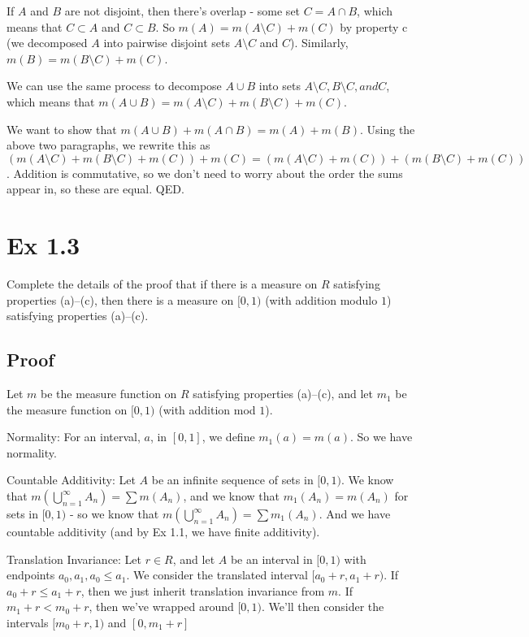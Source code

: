 \documentclass{article}
\begin{document}
If $A$ and $B$ are not disjoint, then there's overlap - some set $C = A \cap B$, which means that $C \subset A$ and $C \subset B$. So $m(A) = m(A \setminus C) + m(C)$ by property c (we decomposed $A$ into pairwise disjoint sets $A \setminus C$ and $C$). Similarly, $m(B) = m(B \setminus C) + m(C)$. 

We can use the same process to decompose $A \cup B$ into sets $A\setminus C, B\setminus C, and C$, which means that $m(A \cup B) = m(A \setminus C) + m(B \setminus C) + m(C)$.

We want to show that $m(A \cup B) + m(A \cap B) = m(A) + m(B)$. Using the above two paragraphs, we rewrite this as $(m(A \setminus C) + m(B \setminus C) + m(C)) + m(C) = (m(A \setminus C) + m(C)) + (m(B \setminus C) + m(C))$. Addition is commutative, so we don't need to worry about the order the sums appear in, so these are equal. QED. 

\section{Ex 1.3}
  Complete the details of the proof that if there is a measure on $R$ satisfying properties (a)--(c), then there is a measure on $[0,1)$ (with addition modulo $1$) satisfying properties (a)--(c).
  
\subsection{Proof}

Let $m$ be the measure function on $R$ satisfying properties (a)--(c), and let $m_1$ be the measure function on $[0,1)$ (with addition mod $1$). 

Normality: For an interval, $a$, in $[0,1]$, we define $m_1(a) = m(a)$. So we have normality. 

Countable Additivity: Let $A$ be an infinite sequence of sets in $[0,1)$. We know that $m(\bigcup_{n=1}^{\infty} A_n)=\sum m(A_n)$, and we know that $m_1(A_n) = m(A_n)$ for sets in $[0,1)$ - so we know that $m(\bigcup_{n=1}^{\infty} A_n)=\sum m_1(A_n)$. And we have countable additivity (and by Ex 1.1, we have finite additivity). 

Translation Invariance: Let $r \in R$, and let $A$ be an interval in $[0,1)$ with endpoints $a_0, a_1, a_0 \leq a_1$. We consider the translated interval $[a_0 + r, a_1 + r)$. If $a_0 + r \leq a_1 + r$, then we just inherit translation invariance from $m$. If $m_1 + r < m_0 + r$, then we've wrapped around $[0,1)$. We'll then consider the intervals $[m_0 + r, 1)$ and $[0, m_1 + r]$
\end{document}
